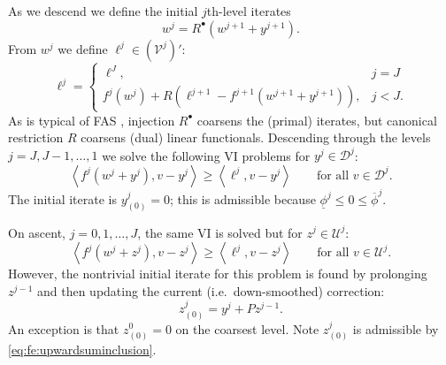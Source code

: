 \documentclass[review,hidelinks,onefignum,onetabnum]{siamart220329}
\newcommand{\cV}{\mathcal{V}}
\newcommand{\ip}[2]{\left<#1,#2\right>}
\newcommand{\iR}{R^{\bullet}}
\begin{document}
As we descend we define the initial $j$th-level iterates
\begin{equation}
w^j = \iR(w^{j+1} + y^{j+1}).  \label{eq:fe:definew}
\end{equation}
From $w^j$ we define $\ell^j \in (\cV^j)'$:
\begin{equation}
\ell^j = \begin{cases} \ell^J, & j=J \\
                       f^j(w^j) + R\left(\ell^{j+1}-f^{j+1}(w^{j+1}+y^{j+1})\right), & j<J. \end{cases} \label{eq:fe:levelsource}
\end{equation}
As is typical of FAS \cite[section 5.3]{Trottenbergetal2001}, injection $\iR$ coarsens the (primal) iterates, but canonical restriction $R$ coarsens (dual) linear functionals.  Descending through the levels $j=J,J-1,\dots,1$ we solve the following VI problems for $y^j \in \mathcal{D}^j$:
\begin{equation}
\ip{f^j(w^j + y^j)}{v-y^j} \ge \ip{\ell^j}{v-y^j} \qquad \text{for all } v\in \mathcal{D}^j. \label{eq:fe:downvi}
\end{equation}
The initial iterate is $y_{(0)}^j=0$; this is admissible because $\underline{\phi}^j \le 0 \le \overline{\phi}^j$.

On ascent, $j=0,1,\dots,J$, the same VI is solved but for $z^j \in \mathcal{U}^j$:
\begin{equation}
\ip{f^j(w^j + z^j)}{v-z^j} \ge \ip{\ell^j}{v-z^j} \qquad \text{for all } v\in \mathcal{U}^j. \label{eq:fe:upvi}
\end{equation}
However, the nontrivial initial iterate for this problem is found by prolonging $z^{j-1}$ and then updating the current (i.e.~down-smoothed) correction:
\begin{equation}
z_{(0)}^j = y^j + P z^{j-1}.  \label{eq:fe:upwardinitial}
\end{equation}
An exception is that $z_{(0)}^0=0$ on the coarsest level.  Note $z_{(0)}^j$ is admissible by \eqref{eq:fe:upwardsuminclusion}.
\end{document}
